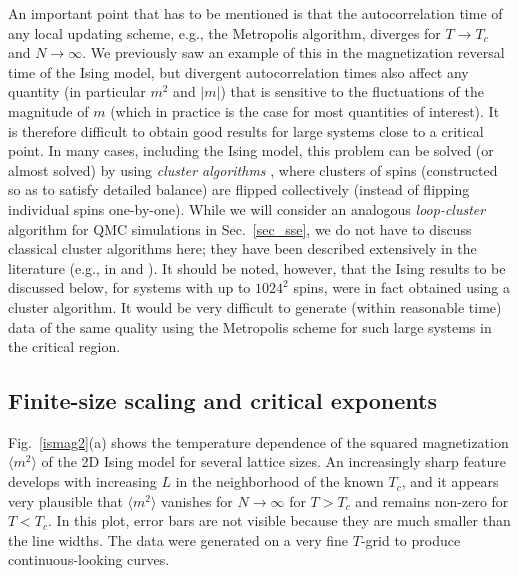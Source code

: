 \documentclass[draft,numberedheadings]{aipproc}
\begin{document}
An important point that has to be mentioned is that the autocorrelation time of any local updating scheme, e.g., the Metropolis algorithm, diverges for 
$T\to T_c$ and $N\to \infty$. We previously saw an example of this in the magnetization reversal time of the Ising model, but divergent autocorrelation 
times also affect any quantity (in particular $m^2$ and $|m|$) that is sensitive to the fluctuations of the magnitude of $m$ (which in practice is the case 
for most quantities of interest). It is therefore difficult to obtain good results for large systems close to a critical point. In many cases, including 
the Ising model, this problem can be solved (or almost solved) by using {\it cluster algorithms} \cite{swendsenwang,wolff}, where clusters of spins 
(constructed so as to satisfy detailed balance) are flipped collectively (instead of flipping individual spins one-by-one). While we will consider an analogous 
{\it loop-cluster} algorithm for QMC simulations in Sec.~\ref{sec_sse}, we do not have to discuss classical cluster algorithms here; they have been 
described extensively in the literature (e.g., in \cite{binderlandau} and \cite{newman}). It should be noted, however, that the Ising 
results to be discussed below, for systems with up to $1024^2$ spins, were in fact obtained using a cluster algorithm. It would be very difficult to 
generate (within reasonable time) data of the same quality using the Metropolis scheme for such large systems in the critical region.

\subsection{Finite-size scaling and critical exponents}
\label{scaling}

Fig.~\ref{ismag2}(a) shows the temperature dependence of the squared magnetization $\langle m^2\rangle$ of the 2D Ising model for several lattice sizes.
An increasingly sharp feature develops with increasing $L$ in the neighborhood of the known $T_c$, and it appears very plausible that $\langle m^2\rangle$ 
vanishes for $N\to \infty$ for $T>T_c$ and remains non-zero for $T<T_c$. In this plot, error bars are not visible because they are much smaller than the 
line widths. The data were generated on a very fine $T$-grid to produce continuous-looking curves.
\end{document}
